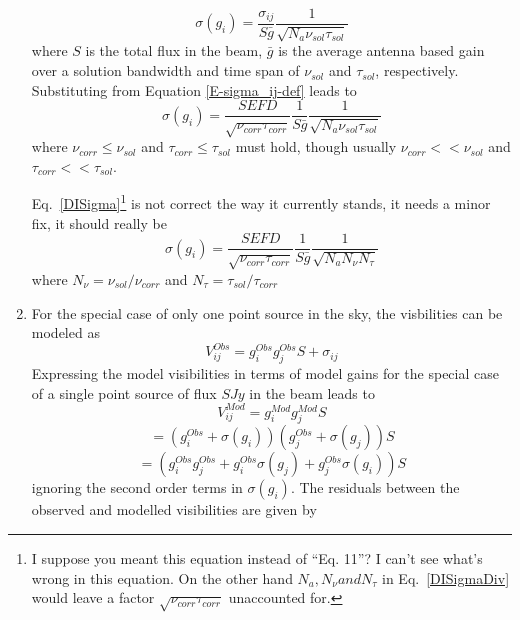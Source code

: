 \documentclass[11pt]{article}
\begin{document}
\begin{enumerate}
\begin{equation}
\sigma(g_i) = \frac {\sigma_{ij}} {S \bar{g}} \frac {1} {\sqrt{N_a \nu_{sol} \tau_{sol}}}
\end{equation}
where $S$ is the total flux in the beam, $\bar{g}$ is the average antenna based gain over a solution bandwidth and time span of $\nu_{sol}$ and $\tau_{sol}$, respectively.
Substituting from Equation \ref{E-sigma_ij-def} leads to
\begin{equation}
\sigma(g_i) = \frac {SEFD} {\sqrt{\nu_{corr} \tau_{corr}}} \frac {1} {S \bar{g}} \frac {1} {\sqrt{N_a \nu_{sol} \tau_{sol}}}
\end{equation}
where $\nu_{corr} \le \nu_{sol}$ and $\tau_{corr} \le \tau_{sol}$ must hold, though usually $\nu_{corr} << \nu_{sol}$ and $\tau_{corr} << \tau_{sol}$.

Eq.~\ref{DISigma}\footnote{I suppose you meant this equation instead
  of ``Eq. 11''?  I can't see what's wrong in this equation.  On the
  other hand $N_a, N_\nu and N_\tau$ in Eq.~\ref{DISigmaDiv} would
  leave a factor $\sqrt{\nu_{corr}\tau_{corr}}$ unaccounted for.} is not correct the way it currently stands, it needs a minor fix, it should really be
\begin{equation}
\label{DISigmaDiv}
\sigma(g_i) = \frac {SEFD} {\sqrt{\nu_{corr} \tau_{corr}}} \frac {1} {S \bar{g}} \frac {1} {\sqrt{N_a N_{\nu} N_{\tau}}}
\end{equation}
where $N_{\nu} = \nu_{sol}/\nu_{corr}$ and $N_{\tau} = \tau_{sol}/\tau_{corr}$ 
\item 
For the special case of only one point source in the sky, the visbilities can be modeled as
\begin{equation}
V_{ij}^{Obs} = g_i^{Obs} g_j^{Obs} S + \sigma_{ij}
\end{equation}
Expressing the model visibilities in terms of model gains for the special case of a single point source of flux $S Jy$ in the beam leads to
\begin{equation}
V_{ij}^{Mod} = g_i^{Mod} g_j^{Mod} S 
\end{equation}
\begin{equation}
= (g_i^{Obs} + \sigma(g_i)) (g_j^{Obs} + \sigma(g_j)) S
\end{equation}
\begin{equation}
= (g_i^{Obs} g_j^{Obs} + g_i^{Obs} \sigma(g_j) +  g_j^{Obs} \sigma(g_i)) S
\end{equation}
ignoring the second order terms in $\sigma(g_i)$.
The residuals between the observed and modelled visibilities are given by

\end{enumerate}
\end{document}
